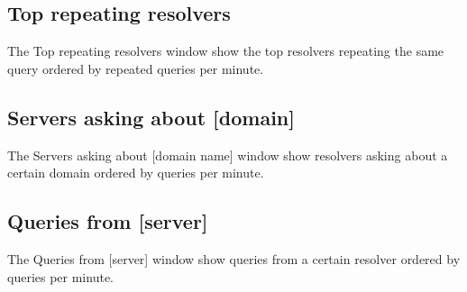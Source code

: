 \documentclass[a4paper]{article}
\begin{document}
\subsection{Top repeating resolvers}
The Top repeating resolvers window show the top resolvers repeating the same 
query ordered by repeated queries per minute. 
\subsection{Servers asking about [domain]}
The Servers asking about [domain name] window show resolvers asking about a 
certain domain ordered by queries per minute. 
\subsection{Queries from [server]}
The Queries from [server] window show queries from a certain resolver ordered 
by queries per minute. 
\end{document}
